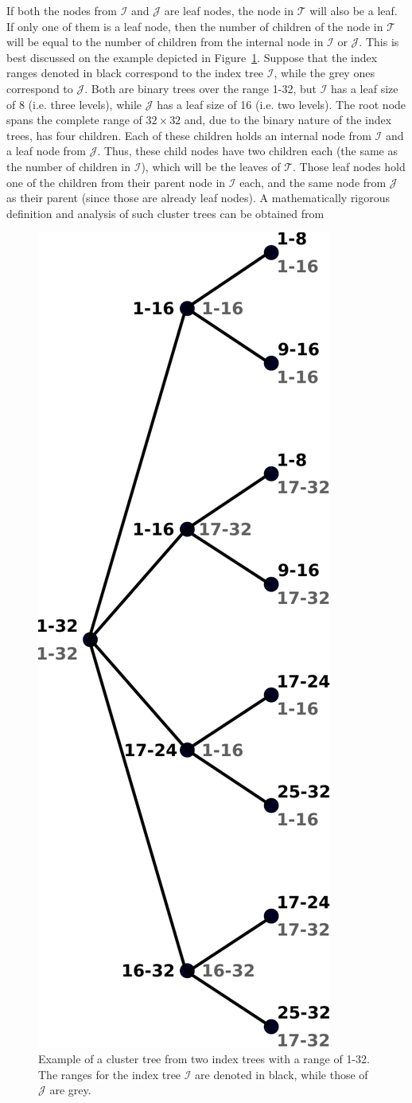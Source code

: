 If both the nodes from $\mathcal{I}$ and $\mathcal{J}$ are leaf nodes, the node in $\mathcal{T}$ will also be a leaf. If only one of them is a leaf node, then the number of children of the node in $\mathcal{T}$ will be equal to the number of children from the internal node in $\mathcal{I}$ or $\mathcal{J}$. This is best discussed on the example depicted in Figure~\hyperref[fig:cluster_tree]{\ref{fig:cluster_tree}}. Suppose that the index ranges denoted in black correspond to the index tree $\mathcal{I}$, while the grey ones correspond to $\mathcal{J}$. Both are binary trees over the range 1-32, but $\mathcal{I}$ has a leaf size of 8 (i.e. three levels), while $\mathcal{J}$ has a leaf size of 16 (i.e. two levels). The root node spans the complete range of $32 \times 32$ and, due to the binary nature of the index trees, has four children. Each of these children holds an internal node from $\mathcal{I}$ and a leaf node from $\mathcal{J}$. Thus, these child nodes have two children each (the same as the number of children in $\mathcal{I}$), which will be the leaves of $\mathcal{T}$. Those leaf nodes hold one of the children from their parent node in $\mathcal{I}$ each, and the same node from $\mathcal{J}$ as their parent (since those are already leaf nodes). A mathematically rigorous definition and analysis of such cluster trees can be obtained from \cite{hackbusch_hierarchical_2015}

\begin{figure}[h]
    \centering
    \includegraphics[width=0.3\linewidth]{chapters/4_hierarchical_matrices/figures/cluster_tree.pdf}
    \caption[Cluster Tree]{Example of a cluster tree from two index trees with a range of 1-32. The ranges for the index tree $\mathcal{I}$ are denoted in black, while those of $\mathcal{J}$ are grey.}  \label{fig:cluster_tree}
\end{figure}
